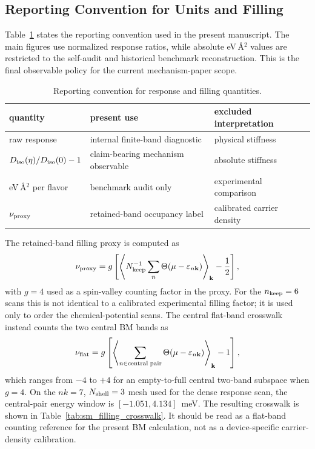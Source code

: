 \documentclass[aps,prb,preprint,superscriptaddress,floatfix,nofootinbib]{revtex4-2}
\begin{document}
\subsection{Reporting Convention for Units and Filling}

Table~\ref{tab:sm_reporting_layers} states the reporting convention used in
the present manuscript.  The main figures use normalized response ratios, while
absolute eV\,\AA$^2$ values are restricted to the self-audit and historical
benchmark reconstruction.
This is the final observable policy for the current mechanism-paper scope.

\begin{table}[h]
\caption{Reporting convention for response and filling quantities.}
\label{tab:sm_reporting_layers}
\begin{ruledtabular}
\begin{tabular}{lll}
quantity & present use & excluded interpretation\\
\hline
raw response & internal finite-band diagnostic & physical stiffness\\
$D_{\rm iso}(\eta)/D_{\rm iso}(0)-1$ & claim-bearing mechanism observable & absolute stiffness\\
eV\,\AA$^2$ per flavor & benchmark audit only & experimental comparison\\
$\nu_{\rm proxy}$ & retained-band occupancy label & calibrated carrier density\\
\end{tabular}
\end{ruledtabular}
\end{table}

The retained-band filling proxy is computed as
\begin{equation}
  \nu_{\rm proxy}
  =
  g\left[
  \left\langle
  N_{\rm keep}^{-1}\sum_n \Theta(\mu-\varepsilon_{n\mathbf{k}})
  \right\rangle_{\mathbf{k}}
  -\frac{1}{2}\right],
\end{equation}
with $g=4$ used as a spin-valley counting factor in the proxy.  For the
$n_{\rm keep}=6$ scans this is not identical to a calibrated experimental
filling factor; it is used only to order the chemical-potential scans.
The central flat-band crosswalk instead counts the two central BM bands as
\begin{equation}
  \nu_{\rm flat}
  =
  g\left[
  \left\langle
  \sum_{n\in{\rm central\;pair}}\Theta(\mu-\varepsilon_{n\mathbf{k}})
  \right\rangle_{\mathbf{k}}
  -1\right],
\end{equation}
which ranges from $-4$ to $+4$ for an empty-to-full central two-band subspace
when $g=4$.  On the $nk=7$, $N_{\rm shell}=3$ mesh used for the dense response
scan, the central-pair energy window is $[-1.051,4.134]$~meV.  The resulting
crosswalk is shown in Table~\ref{tab:sm_filling_crosswalk}.  It should be read
as a flat-band counting reference for the present BM calculation, not as a
device-specific carrier-density calibration.
\end{document}
